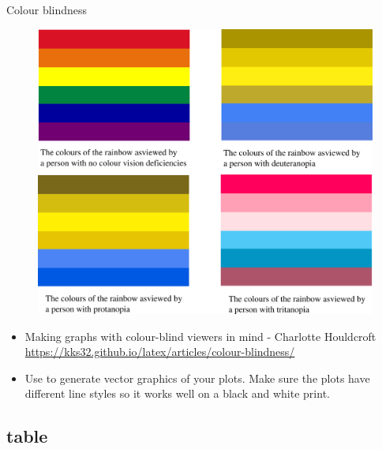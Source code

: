 \documentclass[10pt,times]{beamer}
\begin{document}
\begin{frame}{Colour blindness}
\begin{figure}
\includegraphics[height=0.6\textheight]{figs/colourblindness_rainbow.png}
\end{figure}
\begin{itemize}
\item Making graphs with colour-blind viewers in mind - Charlotte Houldcroft
\href{https://kks32.github.io/latex/articles/colour-blindness/}
{https://kks32.github.io/latex/articles/colour-blindness/}

\item Use  to generate vector graphics of your plots. Make sure 
the plots have different line styles so it works well on a black and white 
print.
\end{itemize}
\end{frame}



\subsection{table}
\end{document}
